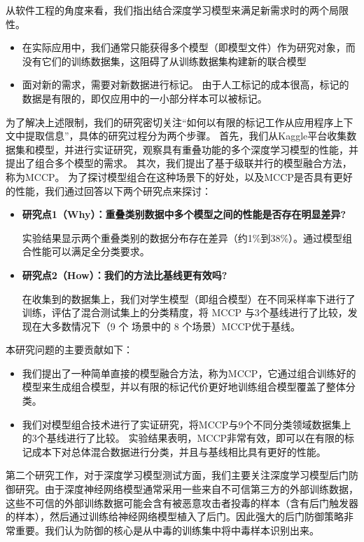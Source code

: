 \documentclass[fontset=macnew,UTF8]{article} %
\begin{document}
从软件工程的角度来看，我们指出结合深度学习模型来满足新需求时的两个局限性。
\begin{itemize}
	\item 在实际应用中，我们通常只能获得多个模型（即模型文件）作为研究对象，而没有它们的训练数据集，这阻碍了从训练数据集构建新的联合模型
	 \item  面对新的需求，需要对新数据进行标记。 由于人工标记的成本很高，标记的数据是有限的，即仅应用中的一小部分样本可以被标记。
\end{itemize}

为了解决上述限制，我们的研究密切关注“如何以有限的标记工作从应用程序上下文中提取信息”，具体的研究过程分为两个步骤。 首先，我们从Kaggle平台收集数据集和模型，并进行实证研究，观察具有重叠功能的多个深度学习模型的性能，并提出了组合多个模型的需求。 其次，我们提出了基于级联并行的模型融合方法，称为MCCP。 为了探讨模型组合在这种场景下的好处，以及MCCP是否具有更好的性能，我们通过回答以下两个研究点来探讨：

\begin{itemize}
	\item \textbf{研究点1（Why）：重叠类别数据中多个模型之间的性能是否存在明显差异?} 
	
	实验结果显示两个重叠类别的数据分布存在差异（约1\%到38\%）。通过模型组合性能可以满足全分类要求。
	
	\item  \textbf{研究点2（How）：我们的方法比基线更有效吗?} 
	
	在收集到的数据集上，我们对学生模型（即组合模型）在不同采样率下进行了训练，评估了混合测试集上的分类精度，将 MCCP 与3个基线进行了比较，发现在大多数情况下（9 个 场景中的 8 个场景）MCCP优于基线。
\end{itemize}

本研究问题的主要贡献如下：

\begin{itemize}
	\item 我们提出了一种简单直接的模型融合方法，称为MCCP，它通过组合训练好的模型来生成组合模型，并以有限的标记代价更好地训练组合模型覆盖了整体分类。
	\item  	我们对模型组合技术进行了实证研究，将MCCP与9个不同分类领域数据集上的3个基线进行了比较。 实验结果表明，MCCP非常有效，即可以在有限的标记成本下对总体混合数据进行分类，并且与基线相比具有更好的性能。
\end{itemize}

第二个研究工作，对于深度学习模型测试方面，我们主要关注深度学习模型后门防御研究。由于深度神经网络模型通常采用一些来自不可信第三方的外部训练数据，这些不可信的外部训练数据可能会含有被恶意攻击者投毒的样本（含有后门触发器的样本），然后通过训练给神经网络模型植入了后门。因此强大的后门防御策略非常重要。我们认为防御的核心是从中毒的训练集中将中毒样本识别出来。
\end{document}
